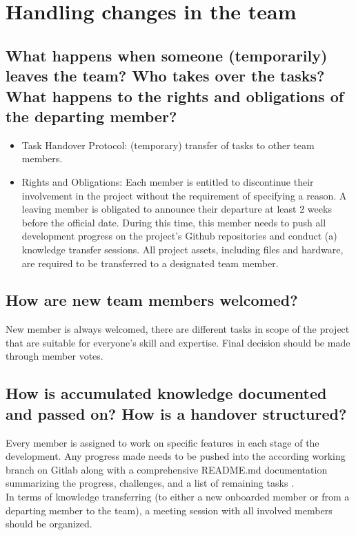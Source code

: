 \documentclass{article}
\begin{document}
\section{Handling changes in the team}
\subsection{What happens when someone (temporarily) leaves the team? Who takes over the tasks? What happens to the rights and obligations of the departing member?}
\begin{itemize}
    \item Task Handover Protocol: (temporary) transfer of tasks to other team members. 
    \item Rights and Obligations: Each member is entitled to discontinue their involvement in the project without the requirement of specifying a reason. A leaving member is obligated to announce their departure at least 2 weeks before the official date. During this time, this member needs to push all development progress on the project's Github repositories and conduct (a) knowledge transfer sessions. All project assets, including files and hardware, are required to be transferred to a designated team member.
\end{itemize}

\subsection{How are new team members welcomed?}
New member is always welcomed, there are different tasks in scope of the project that are suitable for everyone's skill and expertise. Final decision should be made through member votes.

\subsection{How is accumulated knowledge documented and passed on? How is a handover structured?}

Every member is assigned to work on specific features in each stage of the development. Any progress made needs to be pushed into the according working branch on Gitlab along with a comprehensive README.md documentation summarizing the progress, challenges, and a list of remaining tasks . \\

In terms of knowledge transferring (to either a new onboarded member or from a departing member to the team), a meeting session with all involved members should be organized.
\end{document}
